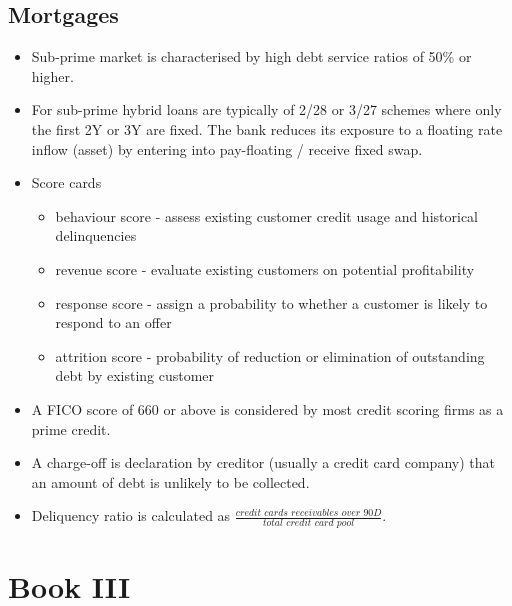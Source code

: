 \subsection{Mortgages}
\begin{itemize}
	\item Sub-prime market is characterised by high debt service ratios of 50\% or higher.
	\item For sub-prime hybrid loans are typically of 2/28 or 3/27 schemes where only the first 2Y or 3Y are fixed. The bank reduces its exposure to a floating rate inflow (asset) by entering into pay-floating / receive fixed swap.
	\item Score cards
	\begin{itemize}
		\item behaviour score - assess existing customer credit usage and historical delinquencies
		\item revenue score - evaluate existing customers on potential profitability
		\item response score - assign a probability to whether a customer is likely to respond to an offer
		\item attrition score - probability of reduction or elimination of outstanding debt by existing customer
	\end{itemize}
	\item A FICO score of 660 or above is considered by most credit scoring firms as a prime credit.
	\item A charge-off is declaration by creditor (usually a credit card company) that an amount of debt is unlikely to be collected.
	\item Deliquency ratio is calculated as $\frac{\textit{credit cards 
	receivables over 90D}}{\textit{total credit card pool}}$.
\end{itemize}

\section{Book III}


